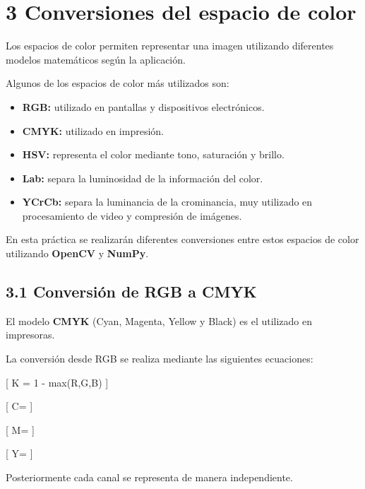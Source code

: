 \documentclass[11pt]{article}
\providecommand{\tightlist}{%
      \setlength{\itemsep}{0pt}\setlength{\parskip}{0pt}}
\begin{document}
    \section{3 Conversiones del espacio de
color}\label{conversiones-del-espacio-de-color}

Los espacios de color permiten representar una imagen utilizando
diferentes modelos matemáticos según la aplicación.

Algunos de los espacios de color más utilizados son:

\begin{itemize}
\tightlist
\item
  \textbf{RGB:} utilizado en pantallas y dispositivos electrónicos.
\item
  \textbf{CMYK:} utilizado en impresión.
\item
  \textbf{HSV:} representa el color mediante tono, saturación y brillo.
\item
  \textbf{Lab:} separa la luminosidad de la información del color.
\item
  \textbf{YCrCb:} separa la luminancia de la crominancia, muy utilizado
  en procesamiento de video y compresión de imágenes.
\end{itemize}

En esta práctica se realizarán diferentes conversiones entre estos
espacios de color utilizando \textbf{OpenCV} y \textbf{NumPy}.

    \subsection{3.1 Conversión de RGB a
CMYK}\label{conversiuxf3n-de-rgb-a-cmyk}

El modelo \textbf{CMYK} (Cyan, Magenta, Yellow y Black) es el utilizado
en impresoras.

La conversión desde RGB se realiza mediante las siguientes ecuaciones:

{[} K = 1 - max(R,G,B) {]}

{[} C= {]}

{[} M= {]}

{[} Y= {]}

Posteriormente cada canal se representa de manera independiente.
\end{document}
